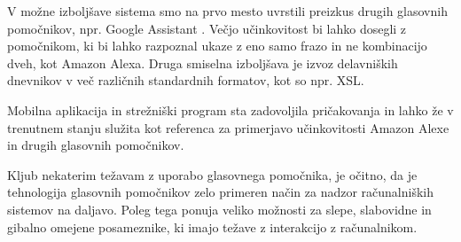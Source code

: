 \documentclass[a4paper, 12pt]{book}
\begin{document}
V možne izboljšave sistema smo na prvo mesto uvrstili preizkus drugih glasovnih pomočnikov, npr. Google Assistant \cite{googleass}.
Večjo učinkovitost bi lahko dosegli z pomočnikom, ki bi lahko razpoznal ukaze z eno samo frazo in ne kombinacijo dveh, kot Amazon Alexa.
Druga smiselna izboljšava je izvoz delavniških dnevnikov v več različnih standardnih formatov, kot so npr. XSL.

Mobilna aplikacija in strežniški program sta zadovoljila pričakovanja in lahko že v trenutnem stanju služita kot referenca za primerjavo učinkovitosti Amazon Alexe in drugih glasovnih pomočnikov.

Kljub nekaterim težavam z uporabo glasovnega pomočnika, je očitno, da je tehnologija glasovnih pomočnikov zelo primeren način za nadzor računalniških sistemov na daljavo.
Poleg tega ponuja veliko možnosti za slepe, slabovidne in gibalno omejene posameznike, ki imajo težave z interakcijo z računalnikom.




\newpage %
\ \\
\clearpage
{}

\printbibliography
\end{document}
